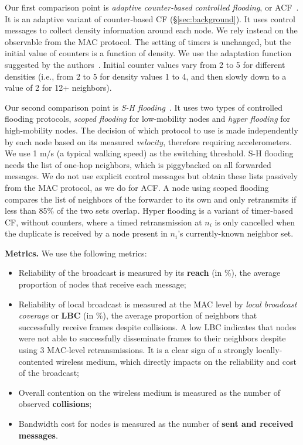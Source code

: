 Our first comparison point is \emph{adaptive counter-based controlled flooding}, or ACF~\citep{2001:AAR:876878.879323}.
It is an adaptive variant of counter-based CF (\S\ref{sec:background}).
It uses control messages to collect density information around each node.
We rely instead on the observable from the MAC protocol.
The setting of timers is unchanged, but the initial value of counters is a function of density.
We use the adaptation function suggested by the authors~\citep[Figure~6]{2001:AAR:876878.879323}.
Initial counter values vary from 2 to 5 for different densities (i.e., from 2 to 5 for density values 1 to 4, and then slowly down to a value of 2 for 12+ neighbors).

Our second comparison point is \emph{S-H flooding}~\citep{adaptive_group_com_iscc02}.
It uses two types of controlled flooding protocols, \emph{scoped flooding} for low-mobility nodes and \emph{hyper flooding} for high-mobility nodes.
The decision of which protocol to use is made independently by each node based on its measured \emph{velocity}, therefore requiring accelerometers.
We use 1 m/s (a typical walking speed) as the switching threshold.
S-H flooding needs the list of one-hop neighbors, which is piggybacked on all forwarded messages.
We do not use explicit control messages but obtain these lists passively from the MAC protocol, as we do for ACF.
A node using scoped flooding compares the list of neighbors of the forwarder to its own and only retransmits if less than 85\% of the two sets overlap.
Hyper flooding is a variant of timer-based CF, without counters, where a timed retransmission at $n_i$ is only cancelled when the duplicate is received by a node present in $n_i$'s currently-known neighbor set.

\smallskip
\noindent
\textbf{Metrics.}
We use the following metrics:
\begin{itemize}
	\item Reliability of the broadcast is measured by its \textbf{reach} (in \%), the average proportion of nodes that receive each message;
	\item Reliability of local broadcast is measured at the MAC level by \emph{local broadcast coverage} or \textbf{LBC} (in \%), the average proportion of neighbors that successfully receive frames despite collisions.
	A low LBC indicates that nodes were not able to successfully disseminate frames to their neighbors despite using 3 MAC-level retransmissions.
	It is a clear sign of a strongly locally-contented wireless medium, which directly impacts on the reliability and cost of the broadcast;
	\item Overall contention on the wireless medium is measured as the number of observed \textbf{collisions};
	\item Bandwidth cost for nodes is measured as the number of \textbf{sent and received messages}.
\end{itemize}


